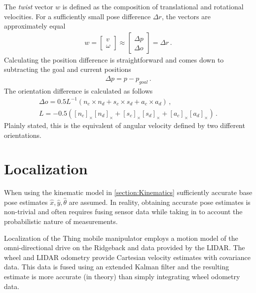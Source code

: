 \documentclass[times, utf8, diplomski, english]{fer}
\begin{document}
The \textit{twist} vector $w$ is defined as the composition of translational and rotational velocities.
For a sufficiently small pose difference $\Delta r$, the vectors are approximately equal
\begin{align}\label{eq:pose_diff}
w  = 
\begin{bmatrix} 
v \\ \omega 
\end{bmatrix} 
\approx 
\begin{bmatrix}
\Delta p \\
\Delta o
\end{bmatrix}
= 
\Delta r \, .
\end{align}
Calculating the position difference is straightforward and comes down to subtracting the goal and current positions
\begin{align}
\Delta p = p - p_{goal}\, .
\end{align}
The orientation difference is calculated as follows \citep{sciavicco2012modelling}
\begin{subequations}\label{eq:pose difference}
\begin{gather}
\Delta o = 0.5 L^{-1} \left( n_c\times n_d + s_c\times s_d + a_c\times a_d \right)\, , \\
L = - 0.5 \left(\left[n_c\right]_{\times}\left[n_d\right]_{\times} + \left[s_c\right]_{\times}\left[s_d\right]_{\times} 
+ \left[a_c\right]_{\times}\left[a_d\right]_{\times} \right)\, .
\end{gather}
\end{subequations}
Plainly stated, this is the equivalent of angular velocity defined by two different orientations.
\section{Localization}\label{section:Localization}
When using the kinematic model in \autoref{section:Kinematics} sufficiently accurate base pose estimates $\hat{x},\hat{y},\hat{\theta}$ are assumed.
In reality, obtaining accurate pose estimates is non-trivial and often requires fusing sensor data while taking in to account the probabilistic nature of measurements.

Localization of the Thing mobile manipulator employs a motion model of the omni-directional drive on the Ridgeback and data provided by the LIDAR.
The wheel and LIDAR odometry provide Cartesian velocity estimates with covariance data.
This data is fused using an extended Kalman filter and the resulting estimate is more accurate (in theory) than simply integrating wheel odometry data.
\end{document}
